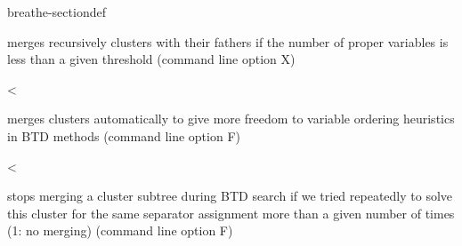 \documentclass[letterpaper,10pt,openany,oneside,english]{sphinxmanual}
\begin{document}
\begin{fulllineitems}
\begin{sphinxuseclass}{breathe-sectiondef}
\begin{fulllineitems}
\sphinxAtStartPar
merges recursively clusters with their fathers if the number of proper variables is less than a given threshold (command line option \sphinxhyphen{}X) 

\end{fulllineitems}


\begin{fulllineitems}
\label{\detokenize{ref/ref_cpp:_CPPv4N8ToulBar221heuristicFreedomLimitE}}\label{\detokenize{ref/ref_cpp:_CPPv3N8ToulBar221heuristicFreedomLimitE}}\label{\detokenize{ref/ref_cpp:_CPPv2N8ToulBar221heuristicFreedomLimitE}}\label{\detokenize{ref/ref_cpp:ToulBar2::heuristicFreedomLimit__i}}
\pysigstartsignatures
\pysigstartmultiline
{}
\pysigstopmultiline
\pysigstopsignatures
\sphinxAtStartPar
\textless{} 

\sphinxAtStartPar
merges clusters automatically to give more freedom to variable ordering heuristics in BTD methods (command line option \sphinxhyphen{}F) 

\end{fulllineitems}


\begin{fulllineitems}
\label{\detokenize{ref/ref_cpp:_CPPv4N8ToulBar29Berge_DecE}}\label{\detokenize{ref/ref_cpp:_CPPv3N8ToulBar29Berge_DecE}}\label{\detokenize{ref/ref_cpp:_CPPv2N8ToulBar29Berge_DecE}}\label{\detokenize{ref/ref_cpp:ToulBar2::Berge_Dec__b}}
\pysigstartsignatures
\pysigstartmultiline
{}
\pysigstopmultiline
\pysigstopsignatures
\sphinxAtStartPar
\textless{} 

\sphinxAtStartPar
stops merging a cluster subtree during BTD search if we tried repeatedly to solve this cluster for the same separator assignment more than a given number of times (\sphinxhyphen{}1: no merging) (command line option \sphinxhyphen{}F) 


\end{fulllineitems}
\end{sphinxuseclass}
\end{fulllineitems}
\end{document}
